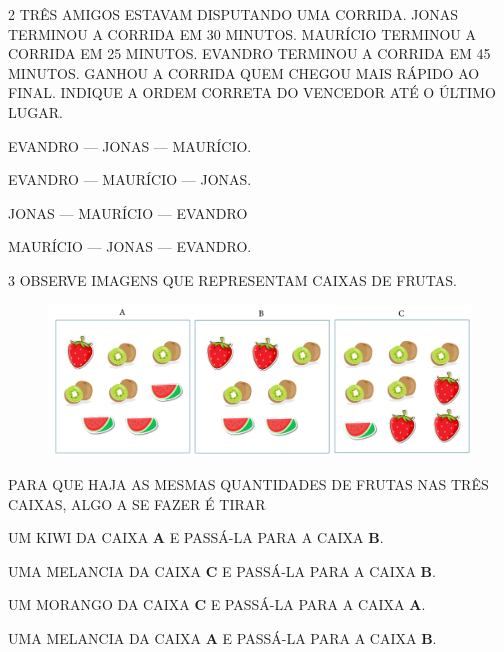 \num{2} TRÊS AMIGOS ESTAVAM DISPUTANDO UMA CORRIDA. JONAS TERMINOU A CORRIDA EM 30
MINUTOS. MAURÍCIO TERMINOU A CORRIDA EM 25 MINUTOS. EVANDRO TERMINOU A
CORRIDA EM 45 MINUTOS. GANHOU A CORRIDA QUEM CHEGOU MAIS RÁPIDO AO FINAL. INDIQUE A
ORDEM CORRETA DO VENCEDOR ATÉ O ÚLTIMO LUGAR.

\begin{escolha}[itemsep=0pt]
\item EVANDRO --- JONAS --- MAURÍCIO.

\item EVANDRO --- MAURÍCIO --- JONAS.

\item JONAS --- MAURÍCIO --- EVANDRO

\item MAURÍCIO --- JONAS --- EVANDRO.
\end{escolha}

\pagebreak
\num{3} OBSERVE IMAGENS QUE REPRESENTAM CAIXAS DE FRUTAS.

\begin{figure}[H]
\centering
\includegraphics[width=\textwidth]{./media/SAEB_1ANO_MAT_FIGURA137.png}
\end{figure}

PARA QUE HAJA AS MESMAS QUANTIDADES DE FRUTAS NAS TRÊS CAIXAS, ALGO
A SE FAZER É TIRAR

\begin{escolha}[itemsep=0pt]
\item UM KIWI DA CAIXA \textbf{A} E PASSÁ-LA PARA A CAIXA \textbf{B}.

\item UMA MELANCIA DA CAIXA \textbf{C} E PASSÁ-LA PARA A CAIXA \textbf{B}.

\item UM MORANGO DA CAIXA \textbf{C} E PASSÁ-LA PARA A CAIXA \textbf{A}.

\item UMA MELANCIA DA CAIXA \textbf{A} E PASSÁ-LA PARA A CAIXA \textbf{B}.
\end{escolha}

